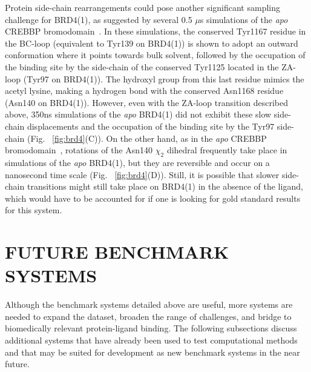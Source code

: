 \documentclass[aps,pre,twocolumn,nofootinbib,superscriptaddress,10pt, final,tightenlines]{revtex4-1}
\begin{document}
Protein side-chain rearrangements could pose another significant sampling challenge for BRD4(1), as suggested by several 0.5 $\mu$s simulations of the \emph{apo} CREBBP bromodomain~\cite{Steiner:2013:FEBSLett., Spilio:2014:Isr.J.Chem.}. 
In these simulations, the conserved Tyr1167 residue in the BC-loop (equivalent to Tyr139 on BRD4(1)) is shown to adopt an outward conformation where it points towards bulk solvent, followed by the occupation of the binding site by the side-chain of the conserved Tyr1125 located in the ZA-loop (Tyr97 on BRD4(1)). 
The hydroxyl group from this last residue mimics the acetyl lysine, making a hydrogen bond with the conserved Asn1168 residue (Asn140 on BRD4(1)). 
However, even with the ZA-loop transition described above, 350ns simulations of the \emph{apo} BRD4(1) did not exhibit these slow side-chain displacements and the occupation of the binding site by the Tyr97 side-chain (Fig. ~\ref{fig:brd4}(C)). 
On the other hand, as in the \emph{apo} CREBBP bromodomain~\cite{Steiner:2013:FEBSLett., Spilio:2014:Isr.J.Chem.}, rotations of the Asn140 $\chi_2$ dihedral frequently take place in simulations of the \emph{apo} BRD4(1), but they are reversible and occur on a nanosecond time scale (Fig. ~\ref{fig:brd4}(D)). 
Still, it is possible that slower side-chain transitions might still take place on BRD4(1) in the absence of the ligand, which would have to be accounted for if one is looking for gold standard results for this system. 

\section{FUTURE BENCHMARK SYSTEMS}
\label{sec:futuresystems}
Although the benchmark systems detailed above are useful, more systems are needed to expand the dataset, broaden the range of challenges, and bridge to biomedically relevant protein-ligand binding.
The following subsections discuss additional systems that have already been used to test computational methods and that may be suited for development as new benchmark systems in the near future.
\end{document}

